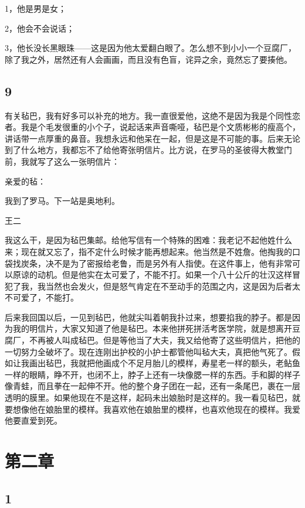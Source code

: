 1，他是男是女； 

2，他会不会说话； 

3，他长没长黑眼珠——这是因为他太爱翻白眼了。怎么想不到小小一个豆腐厂，除了我之外，居然还有人会画画，而且没有色盲，诧异之余，竟然忘了要揍他。 

\subsection{9} 

有关毡巴，我有好多可以补充的地方。我一直很爱他，这绝不是因为我是个同性恋者。我是个毛发很重的小个子，说起话来声音嘶哑，毡巴是个文质彬彬的瘦高个，讲话带一点厚重的鼻音。我想永远和他呆在一起，但是这是不可能的事。后来无论到了什么地方，我都忘不了给他寄张明信片。比方说，在罗马的圣彼得大教堂门前，我就写了这么一张明信片： 

亲爱的毡： 

我到了罗马。下一站是奥地利。 

王二 

我这么干，是因为毡巴集邮。给他写信有一个特殊的困难：我老记不起他姓什么来；现在就又忘了，指不定什么时候才能再想起来。他当然是不姓詹。他掏我的口袋找炭条，决不是为了密报给老鲁，而是另外有人指使。在这件事上，他有非常可以原谅的动机。但是他实在太可爱了，不能不打。如果一个八十公斤的壮汉这样冒犯了我，我当然也会发火，但是怒气肯定在不至动手的范围之内，这是因为后者太不可爱了，不能打。 

后来我回国以后，一见到毡巴，他就尖叫着朝我扑过来，想要掐我的脖子。都是因为我的明信片，大家又知道了他是毡巴。本来他拼死拼活考医学院，就是想离开豆腐厂，不再被人叫成毡巴。但是等他当了大夫，我又给他寄了这些明信片，把他的一切努力全破坏了。现在连刚出护校的小护士都管他叫毡大夫，真把他气死了。假如让我画出毡巴，我就把他画成个不足月胎儿的模样，寿星老一样的额头，老鲇鱼一样的眼睛，睁不开，也闭不上，脖子上还有一块像腮一样的东西。手和脚的样子像青蛙，而且拳在一起伸不开。他的整个身子团在一起，还有一条尾巴，裹在一层透明的膜里。如果他现在不是这样，起码未出娘胎时是这样的。我一看见毡巴，就要想像他在娘胎里的模样。我喜欢他在娘胎里的模样，也喜欢他现在的模样。我爱他要直爱到死。 

\section{第二章}

\subsection{1}


